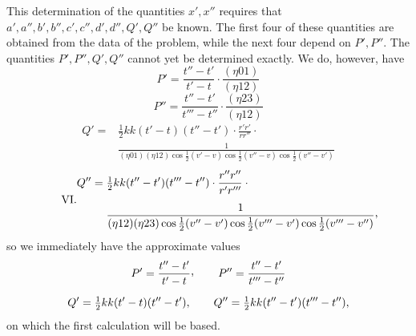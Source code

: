 This determination of the quantities $x',x''$ requires that\newline $a',a'',b',b'',c',c'',d',d'',Q',Q''$ be known. The first four of these quantities are obtained from the data of the problem, while the next four depend on $P',P''$. The quantities $P',P'',Q',Q''$ cannot yet be determined exactly. We do, however, have
\[
\tag*{III.}P'=\frac{t''-t'}{t'-t}\cdot\frac{(\eta01)}{(\eta12)}
\]
\[
\tag*{IV.}P''=\frac{t''-t'}{t'''-t''}\cdot\frac{(\eta23)}{(\eta12)}
\]
\[
\tag*{V.}\begin{aligned}
Q'={}&\tfrac12kk(t'-t)(t''-t')\cdot\frac{r'r'}{rr''}\cdot{}\\[.5em]
&\frac{1}{(\eta01)(\eta12)\cos\tfrac12(v'-v)\cos\tfrac12(v''-v)\cos\tfrac12(v''-v')}
\end{aligned}
\]
\[
\tag*{VI.}\begin{aligned}
Q''={}&\tfrac12kk(t''-t')(t'''-t'')\cdot\frac{r''r''}{r'r'''}\cdot{}\\[.5em]
&\frac{1}{(\eta12)(\eta23)\cos\tfrac12(v''-v')\cos\tfrac12(v'''-v')\cos\tfrac12(v'''-v'')}\mathpunct{\raisebox{.45ex}{,}}
\end{aligned}
\]
so we immediately have the approximate values
\[
\begin{gathered}
P'=\frac{t''-t'}{t'-t}\mathpunct{\raisebox{.45ex}{,}}\qquad P''=\frac{t''-t'}{t'''-t''}\\[.6em]
Q'=\tfrac12kk(t'-t)(t''-t'),\qquad Q''=\tfrac12kk(t''-t')(t'''-t''),
\end{gathered}
\]
on which the first calculation will be based.
